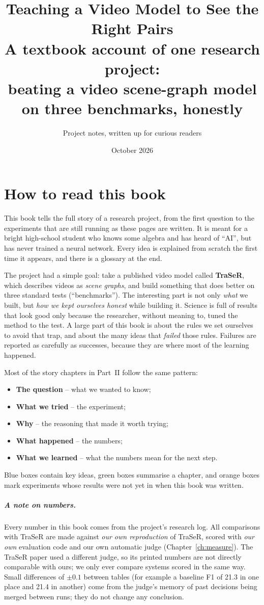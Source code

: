 \documentclass[11pt,openany]{book}
\title{\Huge Teaching a Video Model to See the Right Pairs\\[0.6em]
\Large A textbook account of one research project:\\ beating a video scene-graph model on three benchmarks, honestly}
\author{Project notes, written up for curious readers}
\date{October 2026}
\begin{document}
\frontmatter
\maketitle

\chapter*{How to read this book}
This book tells the full story of a research project, from the first question to the experiments that are still running as these
pages are written. It is meant for a bright high-school student who knows some algebra and has heard of ``AI'', but has never
trained a neural network. Every idea is explained from scratch the first time it appears, and there is a glossary at the end.

The project had a simple goal: take a published video model called \textbf{TraSeR}, which describes videos as \emph{scene
graphs}, and build something that does better on three standard tests (``benchmarks''). The interesting part is not only
\emph{what} we built, but \emph{how we kept ourselves honest} while building it. Science is full of results that look good only
because the researcher, without meaning to, tuned the method to the test. A large part of this book is about the rules we set
ourselves to avoid that trap, and about the many ideas that \emph{failed} those rules. Failures are reported as carefully as
successes, because they are where most of the learning happened.

Most of the story chapters in Part~II follow the same pattern:
\begin{itemize}
  \item \textbf{The question} -- what we wanted to know;
  \item \textbf{What we tried} -- the experiment;
  \item \textbf{Why} -- the reasoning that made it worth trying;
  \item \textbf{What happened} -- the numbers;
  \item \textbf{What we learned} -- what the numbers mean for the next step.
\end{itemize}
Blue boxes contain key ideas, green boxes summarise a chapter, and orange boxes mark experiments whose results were not yet in
when this book was written.

\paragraph{A note on numbers.} Every number in this book comes from the project's research log. All comparisons with TraSeR
are made against \emph{our own reproduction} of TraSeR, scored with \emph{our own} evaluation code and our own automatic judge
(Chapter~\ref{ch:measure}). The TraSeR paper used a different judge, so its printed numbers are not directly comparable with ours;
we only ever compare systems scored in the same way. Small differences of $\pm 0.1$ between tables (for example a baseline F1 of
21.3 in one place and 21.4 in another) come from the judge's memory of past decisions being merged between runs; they do not
change any conclusion.
\end{document}
